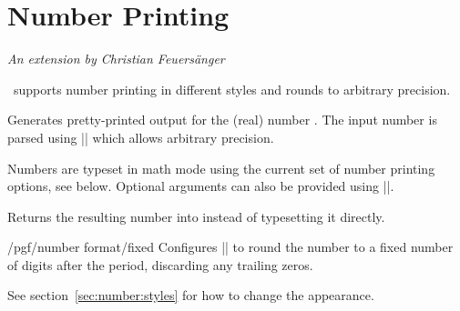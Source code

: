 
\section[math-numberprinting]{Number Printing}
\label{pgfmath-numberprinting}

{\emph{An extension by Christian Feuersänger}}

\medskip
\noindent
\pgfname\ supports number printing in different styles and rounds to arbitrary
precision.

\begin{command}{\pgfmathprintnumber{}}
    Generates pretty-printed output for the (real) number . The input
    number  is parsed using |\pgfmathfloatparsenumber| which allows
    arbitrary precision.

    Numbers are typeset in math mode using the current set of number printing
    options, see below. Optional arguments can also be provided using
    ||.
\end{command}

\begin{command}{\pgfmathprintnumberto{}}
    Returns the resulting number into  instead of typesetting it
    directly.
\end{command}

\begin{key}{/pgf/number format/fixed}
    Configures |\pgfmathprintnumber| to round the number to a fixed number of
    digits after the period, discarding any trailing zeros.
\begin{codeexample}[pre={\begin{lateximage}},post={\end{lateximage}}]
\hspace{1em}
\hspace{1em}
\hspace{1em}
\hspace{1em}
\end{codeexample}

    See section~\ref{sec:number:styles} for how to change the appearance.
\end{key}

